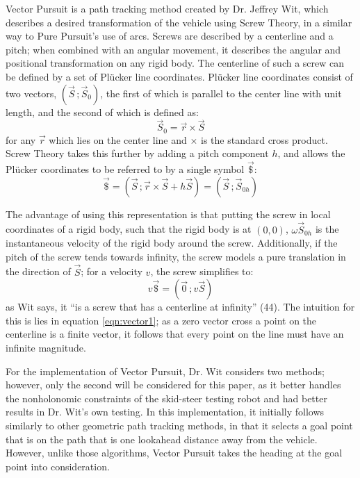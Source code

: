 \documentclass[12pt]{article}
\begin{document}
\begin{flushleft}
Vector Pursuit is a path tracking method created by Dr. Jeffrey Wit, which describes a desired transformation of the vehicle using Screw Theory, in a similar way to Pure Pursuit's use of arcs. Screws are described by a centerline and a pitch; when combined with an angular movement, it describes the angular and positional transformation on any rigid body. The centerline of such a screw can be defined by a set of Plücker line coordinates. Plücker line coordinates consist of two vectors, $(\vec{S}\,; \vec{S}_0)$, the first of which is parallel to the center line with unit length, and the second of which is defined as:
\begin{equation}
\vec{S}_0=\vec{r} \times \vec{S} \label{eqn:vector1}
\end{equation}
for any $\vec{r}$ which lies on the center line and $\times$ is the standard cross product. Screw Theory takes this further by adding a pitch component $h$, and allows the Plücker coordinates to be referred to by a single symbol $\vec{\$}$:
\begin{equation}
\vec{\$}=(\vec{S}\,; \vec{r} \times \vec{S} + h\vec{S}) = (\vec{S}\,; \vec{S}_{0h})
\end{equation}

The advantage of using this representation is that putting the screw in local coordinates of a rigid body, such that the rigid body is at $(0,0)$, $\omega\vec{S}_{0h}$ is the instantaneous velocity of the rigid body around the screw. Additionally, if the pitch of the screw tends towards infinity, the screw models a pure translation in the direction of $\vec{S}$; for a velocity $v$, the screw simplifies to:
\begin{equation}
v\vec{\$}=(\vec{0}\,; v\vec{S})
\end{equation}
as Wit says, it ``is a screw that has a centerline at infinity'' (44). The intuition for this is lies in equation \ref{eqn:vector1}; as a zero vector cross a point on the centerline is a finite vector, it follows that every point on the line must have an infinite magnitude.

For the implementation of Vector Pursuit, Dr. Wit considers two methods; however, only the second will be considered for this paper, as it better handles the nonholonomic constraints of the skid-steer testing robot and had better results in Dr. Wit's own testing. In this implementation, it initially follows similarly to other geometric path tracking methods, in that it selects a goal point that is on the path that is one lookahead distance away from the vehicle. However, unlike those algorithms, Vector Pursuit takes the heading at the goal point into consideration.


\end{flushleft}
\end{document}
